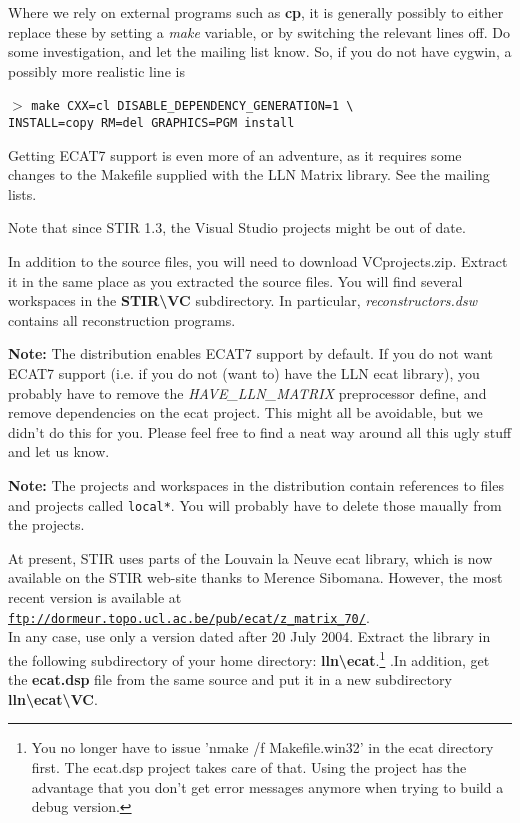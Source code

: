 \documentclass{article}
\def\R2Lurl#1#2{\mbox{\href{#1}{\tt #2}}}
\newcommand{\cmdline}[1]{\par \noindent $>$ \texttt{#1}\par}
\begin{document}
Where we rely on external programs such as \textbf{cp}, it is generally 
possibly to either replace these by setting a \textit{make} variable, 
or by switching the relevant lines off. Do some investigation, 
and let the mailing list know. So, if you do not have cygwin, 
a possibly more realistic line is
\cmdline{make CXX=cl DISABLE\_DEPENDENCY\_GENERATION=1 {\textbackslash}\\
 INSTALL=copy 
RM=del GRAPHICS=PGM install}


Getting ECAT7 support is even more of an adventure, as it requires 
some changes to the Makefile supplied with the LLN Matrix library. 
See the mailing lists.

{ 
}

Note that since STIR 1.3, the Visual Studio projects might be 
out of date.


In addition to the source files, you will need to download VCprojects.zip. 
Extract it in the same place as you extracted the source files. 
You will find several workspaces in the \textbf{STIR{\textbackslash}VC} subdirectory. 
In particular, \textit{reconstructors.dsw} contains all reconstruction 
programs.



\textbf{Note:} The distribution enables ECAT7 support by default. 
If you do not want ECAT7 support (i.e. if you do not (want to) 
have the LLN ecat library), you probably have to remove the \textit{HAVE\_LLN\_MATRIX} preprocessor 
define, and remove dependencies on the ecat project. This might 
all be avoidable, but we didn't do this for you. Please feel 
free to find a neat way around all this ugly stuff and let us 
know.

\textbf{Note:} The projects and workspaces in the distribution contain references to
files and projects called \texttt{local*}. You will probably have to delete those
maually from the projects.


At present, STIR uses parts of the Louvain la Neuve ecat library, 
which is now available on the STIR web-site thanks to Merence 
Sibomana. However, the most recent version is available at\\
 \R2Lurl{ftp://dormeur.topo.ucl.ac.be/pub/ecat/z_matrix_70/ }{ftp://dormeur.topo.ucl.ac.be/pub/ecat/z\_matrix\_70/}. \\
In any case, use only a version dated after 20 July 2004. Extract 
the library in the following subdirectory of your home directory: \textbf{lln{\textbackslash}ecat}.\footnote{{\small You 
no longer have to issue 'nmake /f Makefile.win32' in the ecat 
directory first. The ecat.dsp project takes care of that. Using 
the project has the advantage that you don't get error messages 
anymore when trying to build a debug version.}} .In addition, get 
the \textbf{ecat.dsp} file from the same source and put it in a new 
subdirectory \textbf{lln{\textbackslash}ecat{\textbackslash}VC}.
\end{document}

